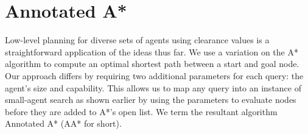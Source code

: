 \section{Annotated A*}
\label{aha:aastar}
Low-level planning for diverse sets of agents using clearance values is a straightforward application of the ideas thus far.
We use a variation on the A* algorithm \cite{astar} to compute an optimal shortest path between a start and goal node.  
Our approach differs by requiring two additional parameters for each query: the agent's size and capability. This allows us to map any query into an instance of small-agent search as shown earlier by using the parameters to evaluate nodes before they are added to A*'s open list. We term the resultant algorithm Annotated A* (AA* for short).
